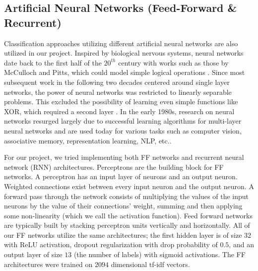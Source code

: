\documentclass[11pt]{article}
\begin{document}
\subsection{Artificial Neural Networks (Feed-Forward \& Recurrent)}
Classification approaches utilizing different artificial neural networks are also utilized in our project. Inspired by biological nervous systems, neural networks date back to the first half of the $20^{th}$ century with works such as those by McCulloch and Pitts, which could model simple logical operations \autocite{Piccinini}. Since most subsequent work in the following two decades centered around single layer networks, the power of neural networks was restricted to linearly separable problems. This excluded the possibility of learning even simple functions like XOR, which required a second layer \autocite{NNLM}. In the early 1980s, research on neural networks resurged largely due to successful learning algorithms for multi-layer neural networks and are used today for various tasks such as computer vision, associative memory, representation learning, NLP, etc..


For our project, we tried implementing both FF networks and recurrent neural network (RNN) architectures. Perceptrons are the building block for FF networks. A perceptron has an input layer of neurons and an output neuron. Weighted connections exist between every input neuron and the output neuron. A forward pass through the network consists of multiplying the values of the input neurons by the value of their connections' weight, summing and then applying some non-linearity (which we call the activation function). Feed forward networks are typically built by stacking perceptron units vertically and horizontally. All of our FF networks utilize the same architectures; the first hidden layer is of size $32$ with ReLU activation, dropout regularization with drop probability of $0.5$, and an output layer of size $13$ (the number of labels) with sigmoid activations. The FF architectures were trained on $2094$ dimensional tf-idf vectors. 
\end{document}
